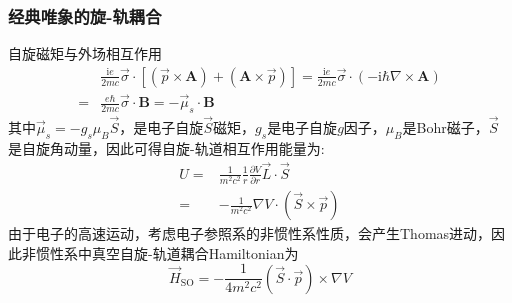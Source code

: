 {\frame
{
	\frametitle{经典唯象的旋-轨耦合}
	自旋磁矩与外场相互作用
	\begin{displaymath}
		\begin{aligned}
			&\frac{\mathrm{i}e}{2mc}\vec\sigma\cdot[(\vec p\times\mathbf{A})+(\mathbf{A}\times\vec p)]=\frac{\mathrm{i}e}{2mc}\vec{\sigma}\cdot(-\mathrm{i}\hbar\nabla\times\mathbf{A})\\
			=&\frac{e\hbar}{2mc}\vec{\sigma}\cdot\mathbf{B}=-\vec{\mu}_s\cdot\mathbf{B}
		\end{aligned}
	\end{displaymath}
	其中$\vec \mu_s=-g_s\mu_B\vec S$，是电子自旋$\vec S$磁矩，$g_s$是电子自旋$g$因子，$\mu_B$是\textrm{Bohr}磁子，$\vec S$是自旋角动量，因此可得自旋-轨道相互作用能量为:
	\begin{displaymath}
		\begin{aligned}
			U=&\frac1{m^2c^2}\frac1r\frac{\partial V}{\partial r}\vec L\cdot\vec S\\
			=&-\frac1{m^2c^2}\nabla V\cdot(\vec S\times\vec p)
		\end{aligned}
	\end{displaymath}
	由于电子的高速运动，考虑电子参照系的非惯性系性质，会产生\textrm{Thomas}进动，因此非惯性系中真空自旋-轨道耦合\textrm{Hamiltonian}为
	\begin{displaymath}
		\vec H_{\mathrm{SO}}=-\frac1{4m^2c^2}(\vec S\cdot\vec p)\times\nabla V
	\end{displaymath}
}

}
